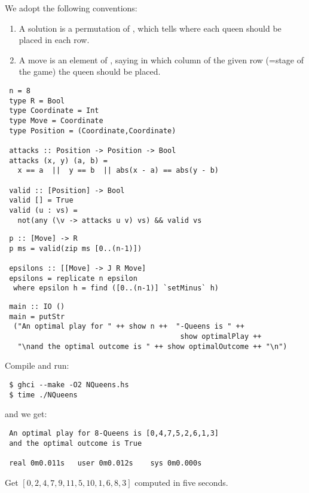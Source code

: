\documentclass%
[%
Screen4to3,
]{foils}
\begin{document}

We adopt the following conventions:
\begin{enumerate}
\item[\grey{1.}] A solution is a permutation of
  \darkblue{$[0..(n-1)]$}, which tells where each queen should be
  placed in each row.
\item[\grey{1.}]  A move is an element of \darkblue{$[0..(n-1)]$},
  saying in which column of the given row (=stage of the game) the
  queen should be placed.
\end{enumerate}


\begin{verbatim}
 n = 8
 type R = Bool
 type Coordinate = Int
 type Move = Coordinate
 type Position = (Coordinate,Coordinate)

 attacks :: Position -> Position -> Bool
 attacks (x, y) (a, b) = 
   x == a  ||  y == b  || abs(x - a) == abs(y - b)

 valid :: [Position] -> Bool
 valid [] = True
 valid (u : vs) =  
   not(any (\v -> attacks u v) vs) && valid vs
\end{verbatim}
\begin{verbatim}
 p :: [Move] -> R
 p ms = valid(zip ms [0..(n-1)])

 epsilons :: [[Move] -> J R Move]
 epsilons = replicate n epsilon
  where epsilon h = find ([0..(n-1)] `setMinus` h)
\end{verbatim}

\begin{verbatim}
 main :: IO ()
 main = putStr 
  ("An optimal play for " ++ show n ++  "-Queens is " ++ 
                                         show optimalPlay ++
   "\nand the optimal outcome is " ++ show optimalOutcome ++ "\n")
\end{verbatim}
Compile and run:
\begin{verbatim}
 $ ghci --make -O2 NQueens.hs
 $ time ./NQueens 
\end{verbatim}
and we get:
\begin{verbatim}
 An optimal play for 8-Queens is [0,4,7,5,2,6,1,3]
 and the optimal outcome is True

 real 0m0.011s   user 0m0.012s    sys 0m0.000s
\end{verbatim}


Get $[0,2,4,7,9,11,5,10,1,6,8,3]$  computed in five
seconds.  
\end{document}
